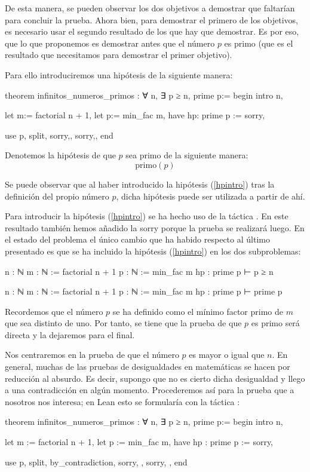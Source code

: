 De esta manera, se pueden observar los dos objetivos a demostrar que faltarían
para concluir la prueba. Ahora bien, para demostrar el primero de los objetivos,
es necesario usar el segundo resultado de los que hay que demostrar. Es por eso,
que lo que proponemos es demostrar antes que el número \(p\) es primo (que es
el resultado que necesitamos para demostrar el primer objetivo).

Para ello introduciremos una hipótesis de la siguiente manera:

\begin{leancode}
theorem infinitos_numeros_primos : ∀ n, ∃ p ≥ n, prime p:=
begin
  intro n,

  let m:= factorial n + 1,
  let p:= min_fac m,
  have hp: prime p := sorry,

  use p,
  split,
  {sorry,},
  {sorry,},
end
\end{leancode}

Denotemos la hipótesis de que \(p\) sea primo de la siguiente manera:
\begin{equation}\tag{hp}\label{hpintro}
  \text{primo}(p)
\end{equation}

Se puede observar que al haber introducido la hipótesis (\ref{hpintro}) tras
la definición del propio número \(p\), dicha hipótesis puede ser utilizada
a partir de ahí.

Para introducir la hipótesis (\ref{hpintro}) se ha hecho uso de la táctica
. En este resultado también hemos añadido la 
{sorry} porque la prueba se realizará luego. En el estado del problema el único
cambio que ha habido respecto al último presentado es que se ha incluido la
hipótesis (\ref{hpintro}) en los dos subproblemas:
\begin{leancode}
n : ℕ
m : ℕ := factorial n + 1
p : ℕ := min_fac m
hp : prime p
⊢ p ≥ n

n : ℕ
m : ℕ := factorial n + 1
p : ℕ := min_fac m
hp : prime p
⊢ prime p
\end{leancode}

Recordemos que el número \(p\) se ha definido como el mínimo factor primo de
\(m\) que sea distinto de uno. Por tanto, se tiene que la prueba de que \(p\)
es primo será directa y la dejaremos para el final.

Nos centraremos en la prueba de que el número \(p\) es mayor o igual que
\(n\). En general, muchas de las pruebas de desigualdades en
matemáticas se hacen por reducción al absurdo. Es decir, supongo que no
es cierto dicha desigualdad y llego a una contradicción en algún
momento. Procederemos así para la prueba que a nosotros nos interesa; en
Lean esto se formularía con la táctica
:
\begin{leancode}
theorem infinitos_numeros_primos : ∀ n, ∃ p ≥ n, prime p:=
begin
  intro n,

  let m := factorial n + 1,
  let p := min_fac m,
  have hp : prime p := sorry,

  use p,
  split,
  { by_contradiction,
    sorry, },
  { sorry, },
end
\end{leancode}

